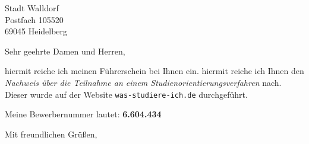 \documentclass[Absender, version=last]{scrlttr2}
\begin{document}
\begin{letter}{%
	Stadt Walldorf\\
	Postfach 105520\\
	69045 Heidelberg
}








\opening{Sehr geehrte Damen und Herren,}

hiermit reiche ich meinen Führerschein bei Ihnen ein. 
hiermit reiche ich Ihnen den \textit{Nachweis über die Teilnahme an einem Studienorientierungsverfahren} nach. Dieser wurde auf der Website \texttt{was-studiere-ich.de} durchgeführt.\par
Meine Bewerbernummer lautet: \textbf{6.604.434}


\closing{Mit freundlichen Grüßen,}






\end{letter}
\end{document}
